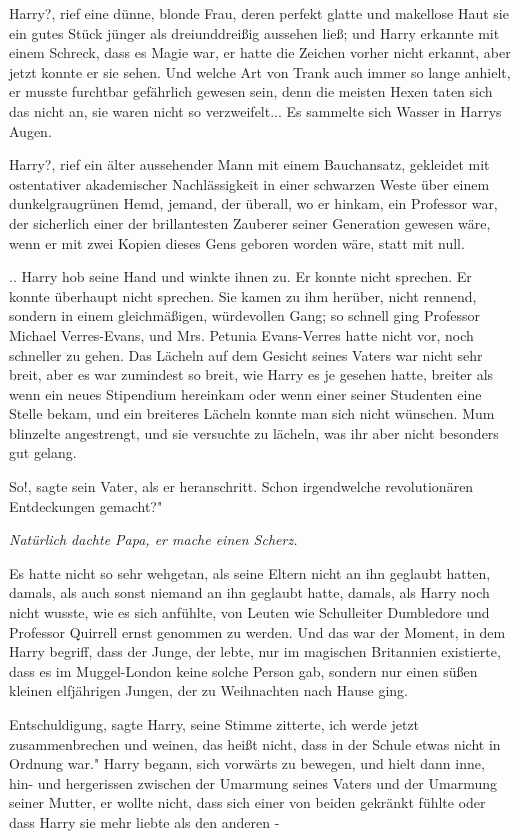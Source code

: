 \glqq Harry?\grqq{}, rief eine dünne, blonde Frau, deren perfekt glatte und
makellose Haut sie ein gutes Stück jünger als dreiunddreißig aussehen ließ; und
Harry erkannte mit einem Schreck, dass es Magie war, er hatte die Zeichen vorher
nicht erkannt, aber jetzt konnte er sie sehen. Und welche Art von Trank auch
immer so lange anhielt, er musste furchtbar gefährlich gewesen sein, denn die
meisten Hexen taten sich das nicht an, sie waren nicht so verzweifelt... Es
sammelte sich Wasser in Harrys Augen.

\glqq Harry?\grqq{}, rief ein älter aussehender Mann mit einem Bauchansatz,
gekleidet mit ostentativer akademischer Nachlässigkeit in einer schwarzen Weste
über einem dunkelgraugrünen Hemd, jemand, der überall, wo er hinkam, ein
Professor war, der sicherlich einer der brillantesten Zauberer seiner Generation
gewesen wäre, wenn er mit zwei Kopien dieses Gens geboren worden wäre, statt mit
null.

.. Harry hob seine Hand und winkte ihnen zu. Er konnte nicht sprechen. Er konnte
überhaupt nicht sprechen. Sie kamen zu ihm herüber, nicht rennend, sondern in
einem gleichmäßigen, würdevollen Gang; so schnell ging Professor Michael
Verres-Evans, und Mrs. Petunia Evans-Verres hatte nicht vor, noch schneller zu
gehen. Das Lächeln auf dem Gesicht seines Vaters war nicht sehr breit, aber es
war zumindest so breit, wie Harry es je gesehen hatte, breiter als wenn ein
neues Stipendium hereinkam oder wenn einer seiner Studenten eine Stelle bekam,
und ein breiteres Lächeln konnte man sich nicht wünschen. Mum blinzelte
angestrengt, und sie versuchte zu lächeln, was ihr aber nicht besonders gut
gelang.

\glqq So!\grqq{}, sagte sein Vater, als er heranschritt. \glqq Schon
irgendwelche revolutionären Entdeckungen gemacht?"

\emph{ Natürlich dachte Papa, er mache einen Scherz.}

Es hatte nicht so sehr wehgetan, als seine Eltern nicht an ihn geglaubt hatten,
damals, als auch sonst niemand an ihn geglaubt hatte, damals, als Harry noch
nicht wusste, wie es sich anfühlte, von Leuten wie Schulleiter Dumbledore und
Professor Quirrell ernst genommen zu werden. Und das war der Moment, in dem
Harry begriff, dass der Junge, der lebte, nur im magischen Britannien
existierte, dass es im Muggel-London keine solche Person gab, sondern nur einen
süßen kleinen elfjährigen Jungen, der zu Weihnachten nach Hause ging.

\glqq Entschuldigung\grqq{}, sagte Harry, seine Stimme zitterte, \glqq ich werde
jetzt zusammenbrechen und weinen, das heißt nicht, dass in der Schule etwas
nicht in Ordnung war." Harry begann, sich vorwärts zu bewegen, und hielt dann
inne, hin- und hergerissen zwischen der Umarmung seines Vaters und der Umarmung
seiner Mutter, er wollte nicht, dass sich einer von beiden gekränkt fühlte oder
dass Harry sie mehr liebte als den anderen -

